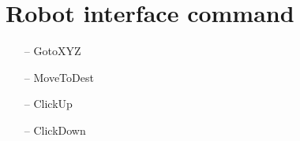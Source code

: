 \section{Robot interface command}
	\begin{itemize}
		\item[--] GotoXYZ
		\item[--] MoveToDest
		\item[--] ClickUp
		\item[--] ClickDown
	\end{itemize}

